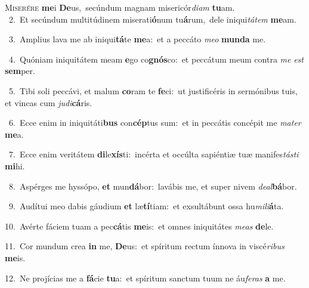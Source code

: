\lettrine{\initial\textcolor{\initialcolor}{M}}{iserére} \textbf{me}\-i \textbf{De}\-us,~\star secúndum magnam misericór\-\textit{di}\-\textit{am} \textbf{tu}\-am.\\
{\numbfont\textcolor{\numbcolor}{~2.}}~Et secúndum multitúdinem miserati\-\textbf{ó}\-num tu\-\textbf{á}\-rum,~\star dele iniqui\-\textit{tá}\-\textit{tem} \textbf{me}\-am.\par
{\numbfont\textcolor{\numbcolor}{~3.}}~Amplius lava me ab iniqui\-\textbf{tá}\-te \textbf{me}\-a:~\star et a peccáto \textit{me}\-\textit{o} \textbf{mun}\-\textbf{da} me.\par
{\numbfont\textcolor{\numbcolor}{~4.}}~Quóniam iniquitátem meam \textbf{e}\-go co\-\textbf{gnós}\-co:~\star et peccátum meum contra \textit{me} \textit{est} \textbf{sem}\-per.\par
{\numbfont\textcolor{\numbcolor}{~5.}}~Tibi soli peccávi, et malum \textbf{co}\-ram te \textbf{fe}\-ci:~\star ut justificéris in sermónibus tuis, et vincas cum \textit{ju}\-\textit{di}\textbf{cá}ris.\par
{\numbfont\textcolor{\numbcolor}{~6.}}~Ecce enim in iniquitáti\textbf{bus} con\-\textbf{cép}\-tus sum:~\star et in peccátis concépit me \textit{ma}\-\textit{ter} \textbf{me}\-a.\par
{\numbfont\textcolor{\numbcolor}{~7.}}~Ecce enim veritátem \textbf{di}\-le\-\textbf{xís}\-ti:~\star incérta et occúlta sapiéntiæ tuæ manifes\-\textit{tás}\-\textit{ti} \textbf{mi}\-hi.\par
{\numbfont\textcolor{\numbcolor}{~8.}}~Aspérges me hyssópo, \textbf{et} mun\-\textbf{dá}\-bor:~\star lavábis me, et super nivem \textit{de}\-\textit{al}\textbf{bá}bor.\par
{\numbfont\textcolor{\numbcolor}{~9.}}~Audítui meo dabis gáudium \textbf{et} læ\-\textbf{tí}\-tiam:~\star et exsultábunt ossa hu\-\textit{mi}\-\textit{li}\textbf{á}ta.\par
{\numbfont\textcolor{\numbcolor}{10.}}~Avérte fáciem tuam a pec\-\textbf{cá}\-tis \textbf{me}\-is:~\star et omnes iniquitátes \textit{me}\-\textit{as} \textbf{de}\-le.\par
{\numbfont\textcolor{\numbcolor}{11.}}~Cor mundum crea \textbf{in} me, \textbf{De}\-us:~\star et spíritum rectum ínnova in viscé\-\textit{ri}\-\textit{bus} \textbf{me}\-is.\par
{\numbfont\textcolor{\numbcolor}{12.}}~Ne projícias me a \textbf{fá}\-cie \textbf{tu}\-a:~\star et spíritum sanctum tuum ne áu\-\textit{fe}\-\textit{ras} \textbf{a} me.\par

